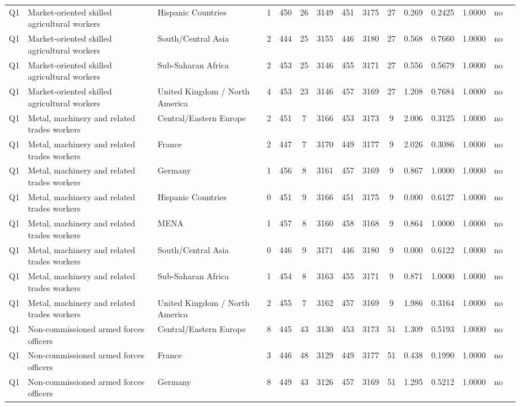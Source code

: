 \begin{longtable}{lllrcccccccccll}
Q1 & Market-oriented skilled agricultural workers & Hispanic Countries & 1 & 450 & 26 & 3149 & 451 & 3175 & 27 & 0.269 & 0.2425 & 1.0000 & no \\
Q1 & Market-oriented skilled agricultural workers & South/Central Asia & 2 & 444 & 25 & 3155 & 446 & 3180 & 27 & 0.568 & 0.7660 & 1.0000 & no \\
Q1 & Market-oriented skilled agricultural workers & Sub-Saharan Africa & 2 & 453 & 25 & 3146 & 455 & 3171 & 27 & 0.556 & 0.5679 & 1.0000 & no \\
Q1 & Market-oriented skilled agricultural workers & United Kingdom / North America & 4 & 453 & 23 & 3146 & 457 & 3169 & 27 & 1.208 & 0.7684 & 1.0000 & no \\
Q1 & Metal, machinery and related trades workers & Central/Eastern Europe & 2 & 451 & 7 & 3166 & 453 & 3173 & 9 & 2.006 & 0.3125 & 1.0000 & no \\
Q1 & Metal, machinery and related trades workers & France & 2 & 447 & 7 & 3170 & 449 & 3177 & 9 & 2.026 & 0.3086 & 1.0000 & no \\
Q1 & Metal, machinery and related trades workers & Germany & 1 & 456 & 8 & 3161 & 457 & 3169 & 9 & 0.867 & 1.0000 & 1.0000 & no \\
Q1 & Metal, machinery and related trades workers & Hispanic Countries & 0 & 451 & 9 & 3166 & 451 & 3175 & 9 & 0.000 & 0.6127 & 1.0000 & no \\
Q1 & Metal, machinery and related trades workers & MENA & 1 & 457 & 8 & 3160 & 458 & 3168 & 9 & 0.864 & 1.0000 & 1.0000 & no \\
Q1 & Metal, machinery and related trades workers & South/Central Asia & 0 & 446 & 9 & 3171 & 446 & 3180 & 9 & 0.000 & 0.6122 & 1.0000 & no \\
Q1 & Metal, machinery and related trades workers & Sub-Saharan Africa & 1 & 454 & 8 & 3163 & 455 & 3171 & 9 & 0.871 & 1.0000 & 1.0000 & no \\
Q1 & Metal, machinery and related trades workers & United Kingdom / North America & 2 & 455 & 7 & 3162 & 457 & 3169 & 9 & 1.986 & 0.3164 & 1.0000 & no \\
Q1 & Non-commissioned armed forces officers & Central/Eastern Europe & 8 & 445 & 43 & 3130 & 453 & 3173 & 51 & 1.309 & 0.5193 & 1.0000 & no \\
Q1 & Non-commissioned armed forces officers & France & 3 & 446 & 48 & 3129 & 449 & 3177 & 51 & 0.438 & 0.1990 & 1.0000 & no \\
Q1 & Non-commissioned armed forces officers & Germany & 8 & 449 & 43 & 3126 & 457 & 3169 & 51 & 1.295 & 0.5212 & 1.0000 & no \\

\end{longtable}
